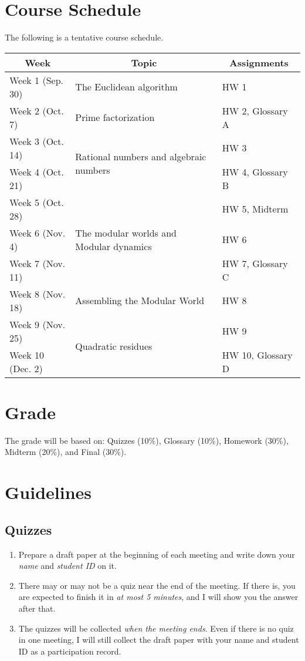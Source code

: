 \documentclass[12pt]{article}
\begin{document}
\section{Course Schedule} 
The following is a tentative course schedule. 
\begin{center}
	\begin{tabular}{l|m{}|l}
		\hline
		\multicolumn{1}{c}{\textsf{Week}} & \multicolumn{1}{c}{\textsf{Topic}} & \multicolumn{1}{c}{\textsf{Assignments}} \\
		\hline
		Week 1 (Sep. 30) & The Euclidean algorithm & HW 1 \\
		\hline
		Week 2 (Oct. 7) & Prime factorization & HW 2, Glossary A \\
		\hline
		Week 3 (Oct. 14) & \multirow{2}{0.4\textwidth}{Rational numbers and algebraic numbers} & HW 3 \\
		\cline{1-1}\cline{3-3}
		Week 4 (Oct. 21) & & HW 4, Glossary B \\
		\hline
		Week 5 (Oct. 28) & \multirow{3}{0.4\textwidth}{The modular worlds and Modular dynamics} & HW 5, Midterm \\
		\cline{1-1}\cline{3-3}
		Week 6 (Nov. 4) & & HW 6 \\
		\cline{1-1}\cline{3-3}
		Week 7 (Nov. 11) & & HW 7, Glossary C \\
		\hline
		Week 8 (Nov. 18) & Assembling the Modular World & HW 8 \\
		\hline
		Week 9 (Nov. 25) & \multirow{2}{0.4\textwidth}{Quadratic residues} & HW 9 \\
		\cline{1-1}\cline{3-3}
		Week 10 (Dec. 2) & & HW 10, Glossary D \\
		\hline
	\end{tabular}
\end{center}

\section{Grade} 
The grade will be based on: Quizzes (10\%), Glossary
(10\%), Homework (30\%), Midterm (20\%), and Final (30\%). 

\section{Guidelines}
\subsection{Quizzes}
\begin{enumerate}
	\item Prepare a draft paper at the beginning of each meeting and write down your \emph{name} and \emph{student ID} on it. 
	\item There may or may not be a quiz near the end of the meeting. If there is, you are expected to finish it in \emph{at most 5 minutes}, and I will show you the answer after that. 
	\item The quizzes will be collected \emph{when the meeting ends}. Even if there is no quiz in one meeting, I will still collect the draft paper with your name and student ID as a participation record. 
\end{enumerate}
\end{document}
